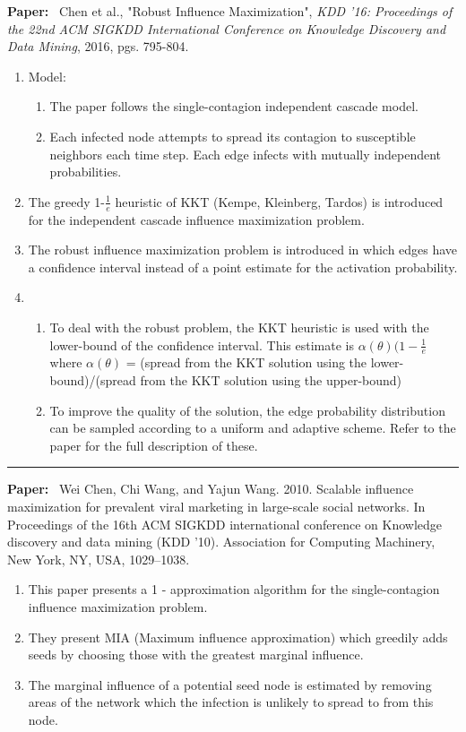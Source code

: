 \documentclass[11pt]{article}
\begin{document}
\textbf{Paper:}~
Chen et al., "Robust Influence Maximization", \emph{KDD '16: Proceedings of the 22nd ACM SIGKDD International Conference on Knowledge Discovery and Data Mining}, 2016, pgs. 795-804.
\begin{enumerate}
    \item Model: \begin{enumerate}
        \item The paper follows the single-contagion independent cascade model.
        \item Each infected node attempts to spread its contagion to susceptible neighbors each time step. Each edge infects with mutually independent probabilities.
    \end{enumerate}
    \item The greedy 1-$\frac{1}{e}$ heuristic of KKT (Kempe, Kleinberg, Tardos) is introduced for the independent cascade influence maximization problem. 
    \item The robust influence maximization problem is introduced in which edges have a confidence interval instead of a point estimate for the activation probability.
    \item \begin{enumerate}
        \item To deal with the robust problem, the KKT heuristic is used with the lower-bound of the confidence interval. This estimate is $\alpha(\theta)(1-\frac{1}{e}$ where $\alpha(\theta)$ = (spread from the KKT solution using the lower-bound)/(spread from the KKT solution using the upper-bound)
        \item To improve the quality of the solution, the edge probability distribution can be sampled according to a uniform and adaptive scheme. Refer to the paper for the full description of these.
    \end{enumerate}
    
\end{enumerate}

\noindent
\rule{\textwidth}{0.01in}
\textbf{Paper:}~ Wei Chen, Chi Wang, and Yajun Wang. 2010. Scalable influence maximization for prevalent viral marketing in large-scale social networks. In Proceedings of the 16th ACM SIGKDD international conference on Knowledge discovery and data mining (KDD ’10). Association for Computing Machinery, New York, NY, USA, 1029–1038. 
\begin{enumerate}
    \item This paper presents a 1 -  approximation algorithm for the single-contagion influence maximization problem.
    \item They present MIA (Maximum influence approximation) which greedily adds seeds by choosing those with the greatest marginal influence.
    \item The marginal influence of a potential seed node is estimated by removing areas of the network which the infection is unlikely to spread to from this node.
    
\end{enumerate}
  
\end{document}
